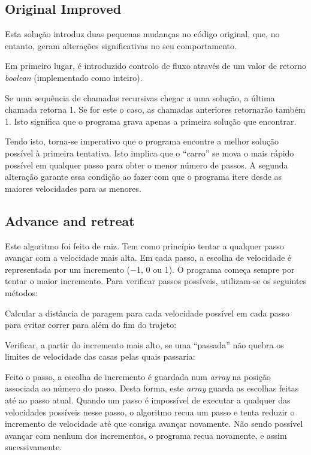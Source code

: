 \documentclass[portuguese,11pt,a4paper,titlepage]{article}
\newcommand{\extrang}[1]{\textit{#1}}
\newcommand{\srcdir}{..}
\begin{document}
\subsection{Original Improved}
Esta solução introduz duas pequenas mudanças no código original, que, no entanto,
geram alterações significativas no seu comportamento.

Em primeiro lugar, é introduzido controlo de fluxo através de um valor de retorno
\extrang{boolean} (implementado como inteiro).

Se uma sequência de chamadas recursivas chegar a uma solução, a última chamada
retorna 1. 
Se for este o caso, as chamadas anteriores retornarão também 1.
Isto significa que o programa grava apenas a primeira solução que encontrar.
\pagebreak

Tendo isto, torna-se imperativo que o programa encontre a melhor solução possível
à primeira tentativa. Isto implica que o ``carro'' se mova o mais rápido possível
em qualquer passo para obter o menor número de passos. A segunda alteração
garante essa condição ao fazer com que o programa itere
desde as maiores velocidades para as menores.


\subsection{Advance and retreat}
Este algoritmo foi feito de raiz. Tem como
princípio tentar a qualquer passo avançar com a velocidade mais alta.
Em cada passo, a escolha de velocidade é representada por um incremento
($-$1, 0 ou 1). O programa começa sempre por tentar o maior incremento.
Para verificar passos possíveis, utilizam-se os seguintes métodos:

Calcular a distância de paragem para cada velocidade possível em cada passo para evitar correr para além do fim do
trajeto:


Verificar, a partir do incremento mais alto, se uma ``passada'' não  quebra
os limites de velocidade das casas pelas quais passaria:


Feito o passo, a escolha de incremento é guardada num \extrang{array}
na posição associada ao número do passo. Desta forma, este \extrang{array}
guarda as escolhas feitas até ao passo atual.
Quando um passo é impossível de executar a qualquer das velocidades possíveis nesse
passo, o algoritmo recua um passo e tenta reduzir o incremento de velocidade até que
consiga avançar novamente. Não sendo possível avançar com nenhum dos incrementos,
o programa recua novamente, e assim sucessivamente.
\pagebreak
\end{document}
